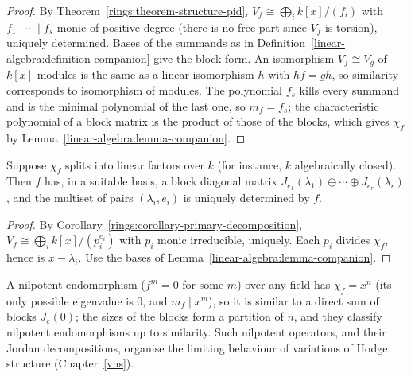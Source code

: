\begin{proof}
By Theorem~\ref{rings:theorem-structure-pid}, $V_f \cong \bigoplus_i k[x]/(f_i)$ with $f_1 \mid \cdots \mid f_s$ monic of
positive degree (there is no free part since $V_f$ is torsion), uniquely determined. Bases of the
summands as in Definition~\ref{linear-algebra:definition-companion} give the block form. An
isomorphism $V_f \cong V_g$ of $k[x]$-modules is the same as a linear isomorphism $h$ with
$hf = gh$, so similarity corresponds to isomorphism of modules. The polynomial $f_s$ kills every
summand and is the minimal polynomial of the last one, so $m_f = f_s$; the characteristic
polynomial of a block matrix is the product of those of the blocks, which gives $\chi_f$ by
Lemma~\ref{linear-algebra:lemma-companion}.
\end{proof}

\begin{theorem}\label{linear-algebra:theorem-jordan}
Suppose $\chi_f$ splits into linear factors over $k$ (for instance, $k$ algebraically closed). Then $f$
has, in a suitable basis, a block diagonal matrix $J_{e_1}(\lambda_1) \oplus \cdots \oplus J_{e_r}(\lambda_r)$, and the
multiset of pairs $(\lambda_i, e_i)$ is uniquely determined by $f$.
\end{theorem}

\begin{proof}
By Corollary~\ref{rings:corollary-primary-decomposition}, $V_f \cong \bigoplus_i k[x]/(p_i^{e_i})$ with $p_i$
monic irreducible, uniquely. Each $p_i$ divides $\chi_f$, hence is $x - \lambda_i$. Use the bases of
Lemma~\ref{linear-algebra:lemma-companion}.
\end{proof}

\begin{example}\label{linear-algebra:example-jordan}
A nilpotent endomorphism ($f^m = 0$ for some $m$) over any field has $\chi_f = x^n$ (its only possible
eigenvalue is $0$, and $m_f \mid x^m$), so it is similar to a direct sum of blocks $J_e(0)$; the sizes of the
blocks form a partition of $n$, and they classify nilpotent endomorphisms up to similarity. Such
nilpotent operators, and their Jordan decompositions, organise the limiting behaviour of
variations of Hodge structure (Chapter~\ref{vhs}).
\end{example}

